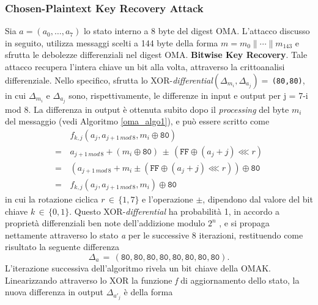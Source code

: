 \subsubsection{Chosen-Plaintext Key Recovery Attack}
Sia $a=\left(a_0,\ldots,a_7\right)$ lo stato interno a 8 byte del digest OMA. L'attacco discusso in seguito, utilizza messaggi scelti a 144 byte della forma $m=m_0 \|\cdots \|m_{143}$ e sfrutta le debolezze differenziali nel digest OMA.
\newline \newline
\textbf{Bitwise Key Recovery}.
Tale attacco recupera l'intera chiave un bit alla volta, attraverso la crittoanalisi differenziale. Nello specifico, sfrutta lo XOR-\textit{differential}$\left(\Delta_{m_i}, \Delta_{a_j}\right) =\,$\texttt{(80,80)}, in cui $\Delta_{m_i}$ e $\Delta_{a_j}$ sono, rispettivamente, le differenze in input e output per j = 7-i mod 8. La differenza in output è ottenuta subito dopo il \textit{processing} del byte $m_i$ del messaggio (vedi Algoritmo \ref{oma_algo1}), e può essere scritto come
\begin{equation*}
\begin{split}
&f_{k,j}\left(a_j, a_{j+1 \, mod \, 8}, m_i \oplus \texttt{80} \right) \\
=\,&a_{j+1\,mod\,8} + \left( m_i \oplus \texttt{80} \right) \, \pm \, \left(\texttt{FF} \oplus (a_j+j) \lll r \right) \\
=\,&\left(a_{j+1\,mod\,8} + m_i \pm ( \texttt{FF} \oplus (a_j+j) \lll r)\right)\oplus \texttt{80} \\
=\,&f_{k,j}\left(a_j, a_{j+1 \, mod \, 8}, m_i\right) \oplus \texttt{80}
\end{split}
\end{equation*}
in cui la rotazione ciclica $r\,\in \, \{1,7\}$ e l'operazione $\pm$, dipendono dal valore del bit chiave $k \, \in \, \{0,1\}$. Questo XOR-\textit{differential} ha probabilità 1, in accordo a proprietà differenziali ben note dell'addizione modulo $2^n$ \cite{diff}, e si propaga nettamente attraverso lo stato \textit{a} per le successive 8 iterazioni, restituendo come risultato la seguente differenza
\begin{equation*}
\Delta_a \, = \, (\texttt{80},\texttt{80},\texttt{80},\texttt{80},\texttt{80},\texttt{80},\texttt{80},\texttt{80}).
\end{equation*}
L'iterazione successiva dell'algoritmo rivela un bit chiave della OMAK. Linearizzando attraverso lo XOR la funzione \textit{f} di aggiornamento dello stato, la nuova differenza in output $\Delta_{a'_j}$ è della forma
